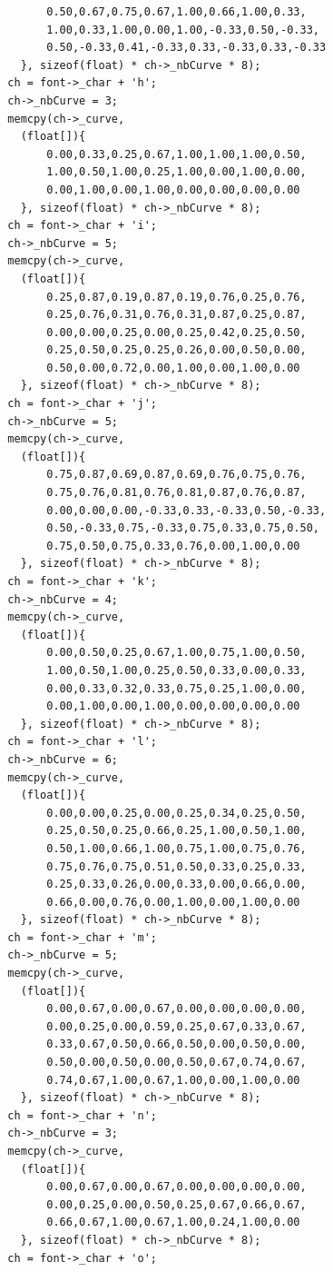 \documentclass[12pt, a4paper]{article}
\begin{document}
\begin{scriptsize}
\begin{ttfamily}
\begin{lstlisting}
        0.50,0.67,0.75,0.67,1.00,0.66,1.00,0.33,
        1.00,0.33,1.00,0.00,1.00,-0.33,0.50,-0.33,
        0.50,-0.33,0.41,-0.33,0.33,-0.33,0.33,-0.33
    }, sizeof(float) * ch->_nbCurve * 8);
  ch = font->_char + 'h';
  ch->_nbCurve = 3;
  memcpy(ch->_curve, 
    (float[]){
        0.00,0.33,0.25,0.67,1.00,1.00,1.00,0.50,
        1.00,0.50,1.00,0.25,1.00,0.00,1.00,0.00,
        0.00,1.00,0.00,1.00,0.00,0.00,0.00,0.00
    }, sizeof(float) * ch->_nbCurve * 8);
  ch = font->_char + 'i';
  ch->_nbCurve = 5;
  memcpy(ch->_curve, 
    (float[]){
        0.25,0.87,0.19,0.87,0.19,0.76,0.25,0.76,
        0.25,0.76,0.31,0.76,0.31,0.87,0.25,0.87,
        0.00,0.00,0.25,0.00,0.25,0.42,0.25,0.50,
        0.25,0.50,0.25,0.25,0.26,0.00,0.50,0.00,
        0.50,0.00,0.72,0.00,1.00,0.00,1.00,0.00
    }, sizeof(float) * ch->_nbCurve * 8);
  ch = font->_char + 'j';
  ch->_nbCurve = 5;
  memcpy(ch->_curve, 
    (float[]){
        0.75,0.87,0.69,0.87,0.69,0.76,0.75,0.76,
        0.75,0.76,0.81,0.76,0.81,0.87,0.76,0.87,
        0.00,0.00,0.00,-0.33,0.33,-0.33,0.50,-0.33,
        0.50,-0.33,0.75,-0.33,0.75,0.33,0.75,0.50,
        0.75,0.50,0.75,0.33,0.76,0.00,1.00,0.00
    }, sizeof(float) * ch->_nbCurve * 8);
  ch = font->_char + 'k';
  ch->_nbCurve = 4;
  memcpy(ch->_curve, 
    (float[]){
        0.00,0.50,0.25,0.67,1.00,0.75,1.00,0.50,
        1.00,0.50,1.00,0.25,0.50,0.33,0.00,0.33,
        0.00,0.33,0.32,0.33,0.75,0.25,1.00,0.00,
        0.00,1.00,0.00,1.00,0.00,0.00,0.00,0.00
    }, sizeof(float) * ch->_nbCurve * 8);
  ch = font->_char + 'l';
  ch->_nbCurve = 6;
  memcpy(ch->_curve, 
    (float[]){
        0.00,0.00,0.25,0.00,0.25,0.34,0.25,0.50,
        0.25,0.50,0.25,0.66,0.25,1.00,0.50,1.00,
        0.50,1.00,0.66,1.00,0.75,1.00,0.75,0.76,
        0.75,0.76,0.75,0.51,0.50,0.33,0.25,0.33,
        0.25,0.33,0.26,0.00,0.33,0.00,0.66,0.00,
        0.66,0.00,0.76,0.00,1.00,0.00,1.00,0.00
    }, sizeof(float) * ch->_nbCurve * 8);
  ch = font->_char + 'm';
  ch->_nbCurve = 5;
  memcpy(ch->_curve, 
    (float[]){
        0.00,0.67,0.00,0.67,0.00,0.00,0.00,0.00,
        0.00,0.25,0.00,0.59,0.25,0.67,0.33,0.67,
        0.33,0.67,0.50,0.66,0.50,0.00,0.50,0.00,
        0.50,0.00,0.50,0.00,0.50,0.67,0.74,0.67,
        0.74,0.67,1.00,0.67,1.00,0.00,1.00,0.00
    }, sizeof(float) * ch->_nbCurve * 8);
  ch = font->_char + 'n';
  ch->_nbCurve = 3;
  memcpy(ch->_curve, 
    (float[]){
        0.00,0.67,0.00,0.67,0.00,0.00,0.00,0.00,
        0.00,0.25,0.00,0.50,0.25,0.67,0.66,0.67,
        0.66,0.67,1.00,0.67,1.00,0.24,1.00,0.00
    }, sizeof(float) * ch->_nbCurve * 8);
  ch = font->_char + 'o';

\end{lstlisting}
\end{ttfamily}
\end{scriptsize}
\end{document}

